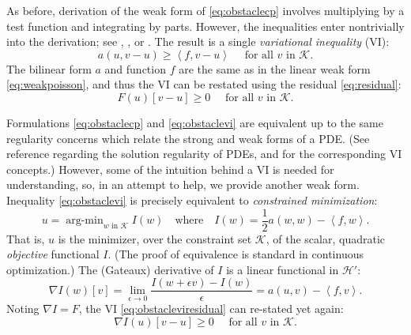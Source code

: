 \documentclass[letterpaper,final,12pt,reqno]{amsart}
\theoremstyle{claim}
\newcommand{\eps}{\epsilon}
\newcommand{\grad}{\nabla}
\newcommand{\ip}[2]{\left<#1,#2\right>}
\numberwithin{equation}{section}
\numberwithin{figure}{section}
\numberwithin{table}{section}
\numberwithin{theorem}{section}
\begin{document}
As before, derivation of the weak form of \eqref{eq:obstaclecp} involves multiplying by a test function and integrating by parts.  However, the inequalities enter nontrivially into the derivation; see \cite[Chapter 12]{Bueler2021}, \cite{JouvetBueler2012}, or \cite{KinderlehrerStampacchia1980}.  The result is a single \emph{variational inequality} (VI):
\begin{equation}
  a(u,v-u) \ge \ip{f}{v-u} \quad \text{ for all } v \text{ in } \mathcal{K}. \label{eq:obstaclevi}
\end{equation}
The bilinear form $a$ and function $f$ are the same as in the linear weak form \eqref{eq:weakpoisson}, and thus the VI can be restated using the residual \eqref{eq:residual}:
\begin{equation}
  F(u)[v-u] \ge 0 \quad \text{ for all } v \text{ in } \mathcal{K}. \label{eq:obstacleviresidual}
\end{equation}

Formulations \eqref{eq:obstaclecp} and \eqref{eq:obstaclevi} are equivalent up to the same regularity concerns which relate the strong and weak forms of a PDE.  (See reference \cite{Evans2010} regarding the solution regularity of PDEs, and \cite{KinderlehrerStampacchia1980} for the corresponding VI concepts.)  However, some of the intuition behind a VI is needed for understanding, so, in an attempt to help, we provide another weak form.  Inequality \eqref{eq:obstaclevi} is precisely equivalent to \emph{constrained minimization}:
\newcommand{\argmin}{\mathop{\mathrm{arg\text{-}min}}}
\begin{equation}
  u = \argmin_{w \text{ in } \mathcal{K}} I(w) \quad \text{where} \quad I(w) = \frac{1}{2} a(w,w) - \ip{f}{w}. \label{eq:obstaclemin}
\end{equation}
That is, $u$ is the minimizer, over the constraint set $\mathcal{K}$, of the scalar, quadratic \emph{objective} functional $I$.  (The proof of equivalence is standard in continuous optimization.)  The (Gateaux) derivative of $I$ is a linear functional in $\mathcal{H}'$:
\begin{equation}
  \grad I(w)[v] = \lim_{\eps\to 0} \frac{I(w+\eps v) - I(w)}{\eps} = a(u,v) - \ip{f}{v}.  \label{eq:gradobjective}
\end{equation}
Noting $\nabla I = F$, the VI \eqref{eq:obstacleviresidual} can re-stated yet again:
\begin{equation}
  \nabla I(u)[v-u] \ge 0 \quad \text{ for all } v \text{ in } \mathcal{K}. \label{eq:obstaclevigradient}
\end{equation}
\end{document}
